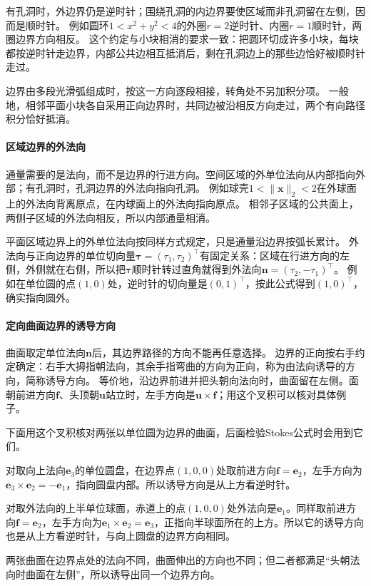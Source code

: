 有孔洞时，外边界仍是逆时针；围绕孔洞的内边界要使区域而非孔洞留在左侧，因而是顺时针。
例如圆环$1<x^2+y^2<4$的外圈$r=2$逆时针、内圈$r=1$顺时针，两圈边界方向相反。
这个约定与小块相消的要求一致：把圆环切成许多小块，每块都按逆时针走边界，内部公共边相互抵消后，剩在孔洞边上的那些边恰好被顺时针走过。

边界由多段光滑弧组成时，按这一方向逐段相接，转角处不另加积分项。
一般地，相邻平面小块各自采用正向边界时，共同边被沿相反方向走过，两个有向路径积分恰好抵消。

\paragraph{区域边界的外法向}

通量需要的是法向，而不是边界的行进方向。空间区域的外单位法向从内部指向外部；有孔洞时，孔洞边界的外法向指向孔洞。
例如球壳$1<\lVert\bm x\rVert_2<2$在外球面上的外法向背离原点，在内球面上的外法向指向原点。
相邻子区域的公共面上，两侧子区域的外法向相反，所以内部通量相消。

平面区域边界上的外单位法向按同样方式规定，只是通量沿边界按弧长累计。
外法向与正向边界的单位切向量$\bm\tau=(\tau_1,\tau_2)^\top$有固定关系：区域在行进方向的左侧，外侧就在右侧，所以把$\bm\tau$顺时针转过直角就得到外法向$\bm n=(\tau_2,-\tau_1)^\top$。
例如在单位圆的点$(1,0)$处，逆时针的切向量是$(0,1)^\top$，按此公式得到$(1,0)^\top$，确实指向圆外。

\paragraph{定向曲面边界的诱导方向}

曲面取定单位法向$\bm n$后，其边界路径的方向不能再任意选择。
边界的正向按右手约定确定：右手大拇指朝法向，其余手指弯曲的方向为正向，称为由法向诱导的方向，简称诱导方向。
等价地，沿边界前进并把头朝向法向时，曲面留在左侧。面朝前进方向$\bm f$、头顶朝$\bm u$站立时，左手方向是$\bm u\times\bm f$；用这个叉积可以核对具体例子。

下面用这个叉积核对两张以单位圆为边界的曲面，后面检验Stokes公式时会用到它们。
\begin{example}[向上圆盘与外向上半球面的诱导方向]
\label{ex:analysis-hemisphere-induced-orientation}
对取向上法向$\bm e_3$的单位圆盘，在边界点$(1,0,0)$处取前进方向$\bm f=\bm e_2$，左手方向为$\bm e_3\times\bm e_2=-\bm e_1$，指向圆盘内部。所以诱导方向是从上方看逆时针。

对取外法向的上半单位球面，赤道上的点$(1,0,0)$处外法向是$\bm e_1$。同样取前进方向$\bm f=\bm e_2$，左手方向为$\bm e_1\times\bm e_2=\bm e_3$，正指向半球面所在的上方。所以它的诱导方向也是从上方看逆时针，与向上圆盘的边界方向相同。
\end{example}
两张曲面在边界点处的法向不同，曲面伸出的方向也不同；但二者都满足“头朝法向时曲面在左侧”，所以诱导出同一个边界方向。

